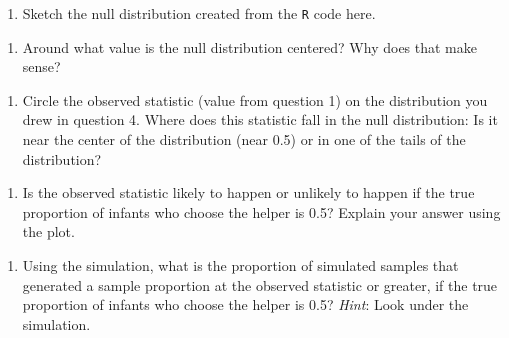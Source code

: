 \documentclass[
]{report}
\providecommand{\tightlist}{%
  \setlength{\itemsep}{0pt}\setlength{\parskip}{0pt}}
\begin{document}
\begin{enumerate}
\def\labelenumi{\arabic{enumi}.}
\setcounter{enumi}{3}
\tightlist
\item
  Sketch the null distribution created from the \texttt{R} code here.
\end{enumerate}

\vspace{1.8in}

\begin{enumerate}
\def\labelenumi{\arabic{enumi}.}
\setcounter{enumi}{4}
\tightlist
\item
  Around what value is the null distribution centered? Why does that make sense?
\end{enumerate}

\vspace{1in}

\begin{enumerate}
\def\labelenumi{\arabic{enumi}.}
\setcounter{enumi}{5}
\tightlist
\item
  Circle the observed statistic (value from question 1) on the distribution you drew in question 4. Where does this statistic fall in the null distribution: Is it near the center of the distribution (near 0.5) or in one of the tails of the distribution?
\end{enumerate}

\vspace{0.2in}

\begin{enumerate}
\def\labelenumi{\arabic{enumi}.}
\setcounter{enumi}{6}
\tightlist
\item
  Is the observed statistic likely to happen or unlikely to happen if the true proportion of infants who choose the helper is 0.5? Explain your answer using the plot.
\end{enumerate}

\vspace{0.5in}

\begin{enumerate}
\def\labelenumi{\arabic{enumi}.}
\setcounter{enumi}{7}
\tightlist
\item
  Using the simulation, what is the proportion of simulated samples that generated a sample proportion at the observed statistic or greater, if the true proportion of infants who choose the helper is 0.5? \emph{Hint}: Look under the simulation.
\end{enumerate}

\vspace{0.2in}
\end{document}
